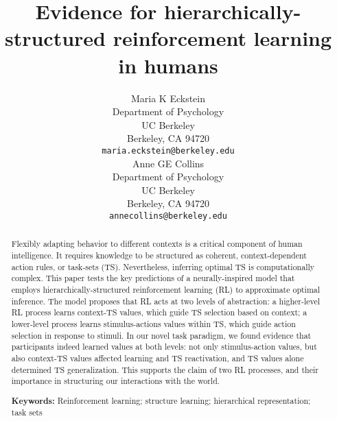\documentclass[10pt, letterpaper]{article}
\title{Evidence for hierarchically-structured reinforcement learning in humans}
\author{
  Maria K Eckstein \\
  Department of Psychology \\
  UC Berkeley \\
  Berkeley, CA 94720 \\
  \texttt{maria.eckstein@berkeley.edu} \\  
  \And
  Anne GE Collins \\
  Department of Psychology \\
  UC Berkeley \\
  Berkeley, CA 94720 \\
  \texttt{annecollins@berkeley.edu} \\
}
\begin{document}
\maketitle


\begin{abstract}

Flexibly adapting behavior to different contexts is a critical component of human intelligence. It requires knowledge to be structured as coherent, context-dependent action rules, or task-sets (TS). Nevertheless, inferring optimal TS is computationally complex. This paper tests the key predictions of a neurally-inspired model that employs hierarchically-structured reinforcement learning (RL) to approximate optimal inference. The model proposes that RL acts at two levels of abstraction: a higher-level RL process learns context-TS values, which guide TS selection based on context; a lower-level process learns stimulus-actions values within TS, which guide action selection in response to stimuli. In our novel task paradigm, we found evidence that participants indeed learned values at both levels: not only stimulus-action values, but also context-TS values affected learning and TS reactivation, and TS values alone determined TS generalization. This supports the claim of two RL processes, and their importance in structuring our interactions with the world.


\textbf{Keywords:} 
Reinforcement learning; structure learning; hierarchical representation; task sets

\end{abstract}
\end{document}
